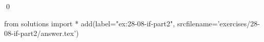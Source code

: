 
\begin{ex}
  \label{ex:28-08-if-part2}
  
  \qed
\end{ex}
\begin{python0}
from solutions import *
add(label="ex:28-08-if-part2",
    srcfilename='exercises/28-08-if-part2/answer.tex')
\end{python0}
